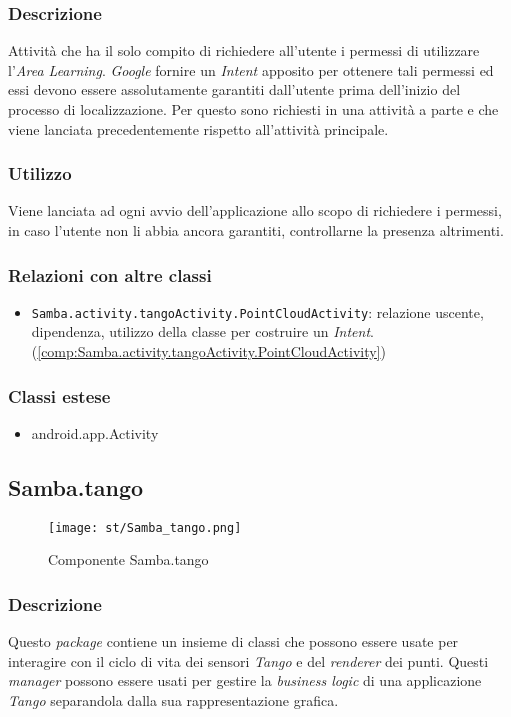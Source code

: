 \subsubsection{Descrizione}
Attività che ha il solo compito di richiedere all'utente i permessi di utilizzare l'\emph{Area Learning}. \emph{Google} fornire un \emph{Intent} apposito per ottenere tali permessi ed essi devono essere assolutamente garantiti dall'utente prima dell'inizio del processo di localizzazione. Per questo sono richiesti in una attività a parte e che viene lanciata precedentemente rispetto all'attività principale.
\subsubsection{Utilizzo}
Viene lanciata ad ogni avvio dell'applicazione allo scopo di richiedere i permessi, in caso l'utente non li abbia ancora garantiti, controllarne la presenza altrimenti.
\subsubsection{Relazioni con altre classi}
\begin{itemize}
	\item \texttt{Samba.activity.tangoActivity.PointCloudActivity}: relazione uscente, dipendenza, utilizzo della classe per costruire un \emph{Intent}. (\ref{comp:Samba.activity.tangoActivity.PointCloudActivity})
\end{itemize}
\subsubsection{Classi estese}
\begin{itemize}
	\item android.app.Activity
\end{itemize}

\newpage
\subsection{Samba.tango}\label{subs:samba-tango}
\label{comp:Samba.tango}
\begin{figure}[H] 
    \centering 
    \texttt{[image: st/Samba\_tango.png]} 
    \caption{Componente Samba.tango}
\end{figure}
\subsubsection{Descrizione}
Questo \emph{package} contiene un insieme di classi che possono essere usate per interagire con il ciclo di vita dei sensori \emph{Tango} e del \emph{renderer} dei punti. Questi \emph{manager} possono essere usati per gestire la \emph{business logic} di una applicazione \emph{Tango} separandola dalla sua rappresentazione grafica.
